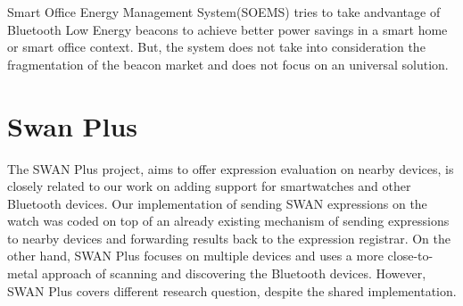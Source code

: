 Smart Office Energy Management System(SOEMS)\cite{smart_location_beacon} tries to take andvantage of Bluetooth Low Energy beacons to achieve better 
power savings in a smart home or smart office context. But, the system does not take into consideration the fragmentation of the beacon market
and does not focus on an universal solution.

\section{Swan Plus}
The SWAN Plus\cite{swan_plus} project,  aims to offer expression evaluation on nearby devices, is closely related to our work on adding support for smartwatches and other Bluetooth devices.
Our implementation of sending SWAN expressions on the watch was coded on top of an already existing mechanism of sending expressions to nearby devices and forwarding results back to the expression
registrar. On the other hand, SWAN Plus focuses on multiple devices and uses a more close-to-metal approach of scanning and discovering the Bluetooth devices.
However, SWAN Plus covers different research question, despite the shared implementation.

